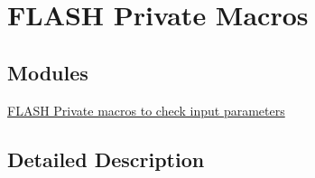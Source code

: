 \hypertarget{group___f_l_a_s_h_ex___private___macros}{}\section{F\+L\+A\+SH Private Macros}
\label{group___f_l_a_s_h_ex___private___macros}
\subsection*{Modules}
\begin{DoxyCompactItemize}
\item 
\hyperlink{group___f_l_a_s_h_ex___i_s___f_l_a_s_h___definitions}{F\+L\+A\+S\+H Private macros to check input parameters}
\end{DoxyCompactItemize}


\subsection{Detailed Description}

